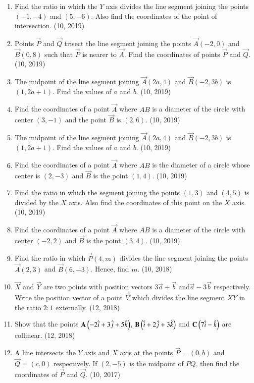\begin{enumerate}[label=\thesubsection.\arabic*,ref=\thesubsection.\theenumi]
\item Find the ratio in which the $Y$ axis divides the line segment joining the points $(-1, -4)$ and $(5, -6)$. Also find the coordinates of the point of intersection. \hfill (10, 2019)
\item Points $\vec{P}$ and $\vec{Q}$ trisect the line segment joining the points $\vec{A}(-2, 0)$ and $\vec{B}(0, 8)$ such that $\vec{P}$ is nearer to $\vec{A}$. Find the coordinates of points $\vec{P}$ and $\vec{Q}$. \hfill (10, 2019)
\item The midpoint of the line segment joining $\vec{A}(2a, 4)$ and $\vec{B}(-2, 3b)$ is $(1, 2a + 1)$. Find the values of $a$ and $b$. \hfill (10, 2019)
\item Find the coordinates of a point $\vec{A}$ where $AB$ is a diameter of the circle with center $(3, -1)$ and the point $\vec{B}$ is $(2, 6)$. \hfill (10, 2019)
\item The midpoint of the line segment joining $\vec{A}(2a, 4)$ and $\vec{B}(-2, 3b)$ is $(1, 2a + 1)$. Find the values of $a$ and $b$. \hfill (10, 2019)
\item Find the coordinates of a point $\vec{A}$ where $AB$ is the diameter of a circle whose center is $(2, -3)$ and $\vec{B}$ is the point $(1, 4)$. \hfill (10, 2019)
\item Find the ratio in which the segment joining the points $(1, 3)$ and $(4, 5)$ is divided by the $X$ axis. Also find the coordinates of this point on the $X$ axis. \hfill (10, 2019)
\item Find the coordinates of a point $\vec{A}$ where $AB$ is a diameter of the circle with center $(-2, 2)$ and $\vec{B}$ is the point $(3, 4)$. \hfill (10, 2019)
    \item Find the ratio in which $\vec{P}(4,m)$ divides the line segment joining the points $\vec{A}(2,3)$ and $\vec{B}(6,-3)$. Hence, find $m$. \hfill (10, 2018)
\item $\vec{X}$ and $\vec{Y}$ are two points with position vectors $3\overrightarrow{a}+\overrightarrow{b}$ and$\overrightarrow{a}-3\overrightarrow{b}$ respectively. Write the position vector of a point $\vec{V}$ which divides the line segment $XY$ in the ratio $2:1$ externally.
\hfill (12, 2018) 
\item Show that the points $\mathbf{A}\left(-2\hat{i} + 3\hat{j} + 5\hat{k}\right)$, $\mathbf{B}\left(\hat{i} + 2\hat{j} + 3\hat{k}\right)$ and $\mathbf{C}\left(7\hat{i} -\hat{k} \right)$ are collinear.
\hfill (12, 2018) 
\item A line intersects the $Y$ axis and $X$ axis at the points $\vec{P} = (0, b)$ and $\vec{Q} = (c, 0)$ respectively. If $(2, -5)$ is the midpoint of $PQ$, then find the coordinates of $\vec{P}$ and $\vec{Q}$. \hfill (10, 2017)

\end{enumerate}
